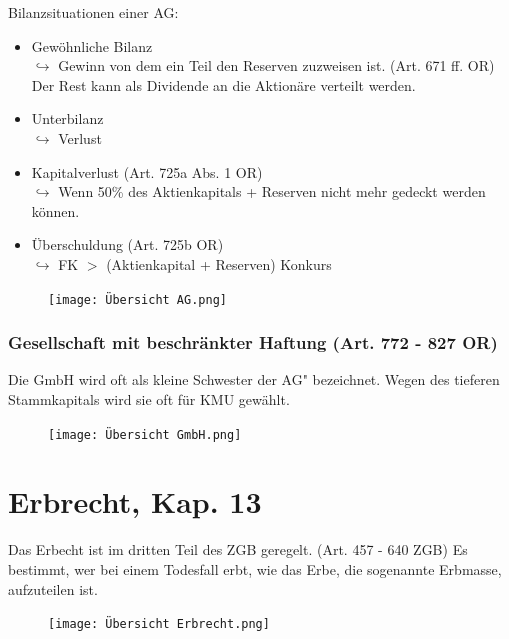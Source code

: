 \documentclass[12pt]{article}
\begin{document}
Bilanzsituationen einer AG:
\begin{itemize}
    \item Gewöhnliche Bilanz\\
    $\hookrightarrow$ Gewinn von dem ein Teil den Reserven zuzweisen ist. (Art. 671 ff. OR) Der Rest kann als Dividende an die Aktionäre verteilt werden.
    \item Unterbilanz\\
    $\hookrightarrow$ Verlust
    \item Kapitalverlust (Art. 725a Abs. 1 OR)\\
    $\hookrightarrow$ Wenn 50\% des Aktienkapitals + Reserven nicht mehr gedeckt werden können.
    \item Überschuldung (Art. 725b OR)\\
    $\hookrightarrow$ FK $>$ (Aktienkapital + Reserven) \textrightarrow Konkurs
\end{itemize}
\begin{figure}[h]
    \begin{center}
            \texttt{[image: Übersicht AG.png]}
    \end{center}
\end{figure}
\newpage
\subsubsection{Gesellschaft mit beschränkter Haftung (Art. 772 - 827 OR)}
Die GmbH wird oft als \glqq kleine Schwester der AG" bezeichnet. Wegen des tieferen Stammkapitals wird sie oft für KMU gewählt.
\begin{figure}[h]
    \begin{center}
            \texttt{[image: Übersicht GmbH.png]}
    \end{center}
\end{figure}

\section{Erbrecht, Kap. 13}
Das Erbecht ist im dritten Teil des ZGB geregelt. (Art. 457 - 640 ZGB) Es bestimmt, wer bei einem Todesfall erbt, wie das Erbe, die sogenannte Erbmasse, aufzuteilen ist.
\begin{figure}[h]
    \begin{center}
            \texttt{[image: Übersicht Erbrecht.png]}
    \end{center}
\end{figure}
\newpage
\end{document}

